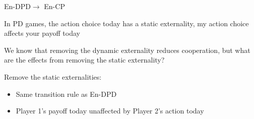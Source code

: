\documentclass{beamer}
\begin{document}
\begin{frame}{En-DPD$\rightarrow$ En-CP}
\begin{card}
 In PD games, the action choice today has a static externality, my
action choice affects your payoff today

 We know that removing the dynamic externality reduces cooperation,
but what are the effects from removing the static externality?
\end{card}
\begin{card}[Manipulation 6 \& 7] Remove the static externalities:
\begin{itemize}
\item Same transition rule as En-DPD
\item Player 1's payoff today unaffected by Player 2's action today
\end{itemize}
\end{card}
\end{frame}
\end{document}
